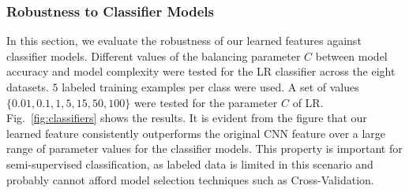


\subsubsection{Robustness to Classifier Models}
In this section, we evaluate the robustness of our learned features
against classifier models. Different values of the balancing parameter
$C$ between model accuracy and model complexity were tested for the LR
classifier across the eight datasets.  $5$ labeled training examples
per class were used.  A set of values $\{0.01, 0.1, 1, 5, 15, 50,
100\}$ were tested for the parameter $C$ of LR. Fig.~\ref{fig:classifiers}
shows the results. It is evident from the figure that our learned
feature consistently outperforms the original CNN feature over a large
range of parameter values for the classifier models. This property is
important for semi-supervised classification, as labeled data is
limited in this scenario and probably cannot afford model selection
techniques such as Cross-Validation.


